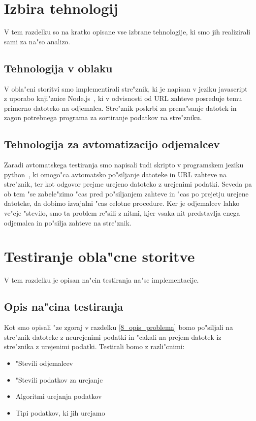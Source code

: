 \section{Izbira tehnologij}
V tem razdelku so na kratko opisane vse izbrane tehnologije, ki smo jih realizirali sami za na"so analizo.

\subsection{Tehnologija v oblaku}
V obla"cni storitvi smo implementirali stre"znik, ki je napisan v jeziku javascript z uporabo knji"znice Node.js~\cite{8_nodejs}, ki v odvisnosti od URL zahteve posreduje temu primerno datoteko na odjemalca. Stre"znik poskrbi za prena"sanje datotek in zagon potrebnega programa za sortiranje podatkov na stre"zniku.

\subsection{Tehnologija za avtomatizacijo odjemalcev}
Zaradi avtomatskega testiranja smo napisali tudi skripto v programskem jeziku python~\cite{8_python}, ki omogo"ca avtomatsko po"siljanje datoteke in URL zahteve na stre"znik, ter kot odgovor prejme urejeno datoteko z urejenimi podatki. Seveda pa ob tem "se zabele"zimo "cas pred po"siljanjem zahteve in "cas po prejetju urejene datoteke, da dobimo izvajalni "cas celotne procedure. Ker je odjemalcev lahko ve"cje "stevilo, smo ta problem re"sili z nitmi, kjer vsaka nit predstavlja enega odjemalca in po"silja zahteve na stre"znik.

\section{Testiranje obla"cne storitve}
V tem razdelku je opisan na"cin testiranja na"se implementacije.

\subsection{Opis na"cina testiranja}
Kot smo opisali "ze zgoraj v razdelku \ref{8_opis_problema} bomo po"siljali na stre"znik datoteke z neurejenimi podatki in "cakali na prejem datotek iz stre"znika z urejenimi podatki. Testirali bomo z razli"cnimi:
\begin{itemize}
  \item "Stevili odjemalcev
  \item "Stevili podatkov za urejanje
  \item Algoritmi urejanja podatkov
  \item Tipi podatkov, ki jih urejamo
\end{itemize}


